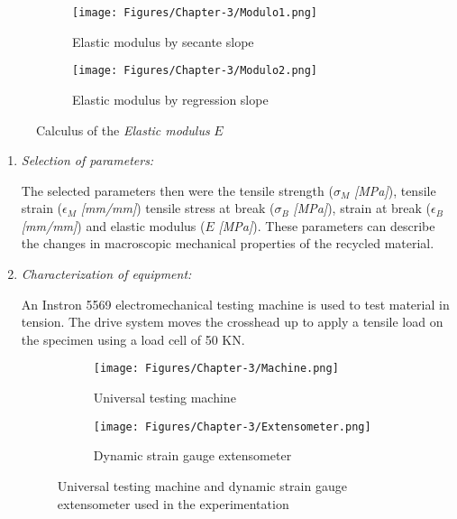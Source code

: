 \begin{figure}[H]
	\centering
	\begin{subfigure}[t]{0.36\textwidth}
		\texttt{[image: Figures/Chapter-3/Modulo1.png]}
		\caption{Elastic modulus by secante slope}
		\label{modulo1}
	\end{subfigure}
	\qquad
	\begin{subfigure}[t]{0.36\textwidth}
		\texttt{[image: Figures/Chapter-3/Modulo2.png]}
		\caption{Elastic modulus by regression slope}
		\label{modulo2}
	\end{subfigure}
	\caption{Calculus of the \emph{Elastic modulus} $E$}
	\label{elastic.modulus}
\end{figure}


\begin{enumerate}[leftmargin=0in, label=\emph{\alph*}.]
	
	\item \textit{Selection of parameters:}
	
	The selected parameters then were the tensile strength  ($\sigma_{M}$ \textit{[MPa]}), tensile strain ($\epsilon_{M}$ \textit{[mm/mm]})  tensile stress at break ($\sigma_{B}$ \textit{[MPa]}), strain at break ($\epsilon_{B}$ \textit{[mm/mm]}) and elastic modulus ($E$ \textit{[MPa]}). 
	These parameters can describe the changes in macroscopic mechanical properties of the recycled material.
	
	\item \textit{Characterization of equipment:}
	
	An Instron 5569 electromechanical testing machine is used to test material in tension. 
	The drive system moves the crosshead up to apply a tensile load on the specimen using a load cell of 50 KN. 
	
	
	\begin{figure}[H]
		\centering
		\begin{subfigure}[t]{0.6\textwidth}
			\texttt{[image: Figures/Chapter-3/Machine.png]}
			\caption{Universal testing machine}
			\label{mechanical.machine}
		\end{subfigure}
		\hfill
		\begin{subfigure}[t]{0.35\textwidth}
			\texttt{[image: Figures/Chapter-3/Extensometer.png]}
			\caption{Dynamic strain gauge extensometer}
			\label{mechanical.extensometer}
		\end{subfigure}
		\caption{Universal testing machine and dynamic strain gauge extensometer used in the experimentation}
		\label{apparatus}
	\end{figure}
	

\end{enumerate}
